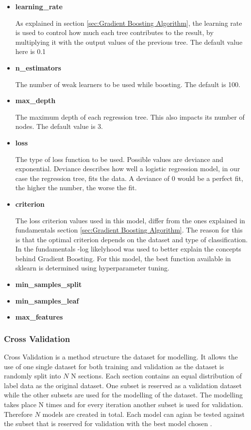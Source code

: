 \begin{itemize}
    \item \textbf{learning\_rate}
    
    As explained in section \ref{sec:Gradient Boosting Algorithm}, the learning rate is used to control how
    much each tree contributes to the result, by multiplying it with the output values of the previous 
    tree. The default value here is 0.1
    \item \textbf{n\_estimators}

    The number of weak learners to be used while boosting. The default is 100.
    \item \textbf{max\_depth}

    The maximum depth of each regression tree. This also impacts its number of nodes.
    The default value is 3.
    \item \textbf{loss}

    The type of loss function to be used. Possible values are deviance and exponential.
    Deviance describes how well a logistic regression model, in our case the regression tree,
    fits the data. A deviance of 0 would be a perfect fit, the higher the number, the worse the fit.


    \item \textbf{criterion}

    The loss criterion values used in this model, differ from the ones explained in fundamentals
    section \ref{sec:Gradient Boosting Algorithm}. The reason for this is that the optimal criterion
    depends on the dataset and type of classification. In the fundamentals -log likelyhood was used
    to better explain the concepts behind Gradient Boosting. For this model, the best function
    available in sklearn is determined using hyperparameter tuning.
    \item \textbf{min\_samples\_split}
    \item \textbf{min\_samples\_leaf}
    \item \textbf{max\_features}
\end{itemize}

\subsubsection{Cross Validation}

Cross Validation is a method structure the dataset for modelling. It allows the use of 
one single dataset for both training and validation as the dataset is randomly split into \(N\) N sections. Each 
section contains an equal distribution of label data as the original dataset. One subset is reserved as a 
validation dataset while the other subsets are used for the modelling of the dataset. The modelling takes place 
N times and for every iteration another subset is used for validation. Therefore \(N\) models are created in total. 
Each model can agian be tested against the subset that is reserved for validation with the best model chosen \cite[p.8f]{lewis2000introduction}. 

